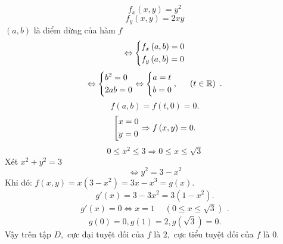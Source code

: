 \documentclass[12pt,a4paper]{article}
\begin{document}
\[{f_x}\left( {x,y} \right) = {y^2}\]
\[{f_y}\left( {x,y} \right) = 2xy\]
\(\left( {a,b} \right)\) là điểm dừng của hàm \(f\)
\[ \Leftrightarrow \left\{ \begin{gathered}
  {f_x}\left( {a,b} \right) = 0 \hfill \\
  {f_y}\left( {a,b} \right) = 0 \hfill \\ 
\end{gathered}  \right.\]
\[ \Leftrightarrow \left\{ \begin{gathered}
  {b^2} = 0 \hfill \\
  2ab = 0 \hfill \\ 
\end{gathered}  \right. \Leftrightarrow \left\{ \begin{gathered}
  a = t \hfill \\
  b = 0 \hfill \\ 
\end{gathered}  \right.,\begin{array}{*{20}{c}}
  {}&{\left( {t \in \mathbb{R}} \right)} 
\end{array}.\]
\[f\left( {a,b} \right) = f\left( {t,0} \right) = 0.\]
\[\left[ \begin{gathered}
  x = 0 \hfill \\
  y = 0 \hfill \\ 
\end{gathered}  \right. \Rightarrow f\left( {x,y} \right) = 0.\]
\[0 \leqslant {x^2} \leqslant 3 \Rightarrow 0 \leqslant x \leqslant \sqrt 3 \]
Xét \({x^2} + {y^2} = 3\) 
\[\Leftrightarrow {y^2} = 3 - {x^2}\]
Khi đó: \(f\left( {x,y} \right) = x\left( {3 - {x^2}} \right) = 3x - {x^3} = g\left( x \right).\)
\[g'\left( x \right) = 3 - 3{x^2} = 3\left( {1 - {x^2}} \right).\]
\[g'\left( x \right) = 0 \Leftrightarrow x = 1\begin{array}{*{20}{c}}
  {}&{\left( {0 \leqslant x \leqslant \sqrt 3 } \right)} 
\end{array}.\]
\[g\left( 0 \right) = 0,g\left( 1 \right) = 2,g\left( {\sqrt 3 } \right) = 0.\]
Vậy trên tập \(D,\) cực đại tuyệt đối của \(f\) là \(2,\) cực tiểu tuyệt đối của \(f\) là \(0.\)
\end{document}
